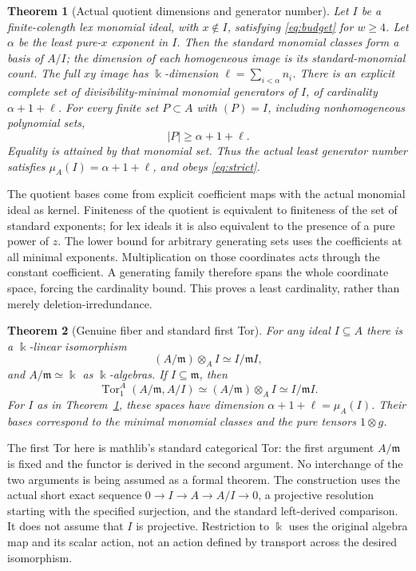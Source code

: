 \documentclass[11pt,a4paper]{article}
\newtheorem{theorem}{Theorem}[section]
\newcommand{\kk}{\Bbbk}
\begin{document}
\begin{theorem}[Actual quotient dimensions and generator number]\label{thm:actual}
Let $I$ be a finite-colength lex monomial ideal, with $x\notin I$, satisfying
\eqref{eq:budget} for $w\ge4$. Let $\alpha$ be the least pure-$x$ exponent in $I$.
Then the standard monomial classes form a basis of $A/I$; the dimension of each
homogeneous image is its standard-monomial count. The full $xy$ image has
$\kk$-dimension $\ell=\sum_{i<\alpha}n_i$.
There is an explicit complete set of divisibility-minimal monomial generators
of $I$, of cardinality $\alpha+1+\ell$. For every finite set $P\subset A$ with
$(P)=I$, including nonhomogeneous polynomial sets,
\[
 |P|\ge\alpha+1+\ell.
\]
Equality is attained by that monomial set. Thus the actual least generator
number satisfies $\mu_A(I)=\alpha+1+\ell$, and obeys \eqref{eq:strict}.
\end{theorem}

The quotient bases come from explicit coefficient maps with the actual
monomial ideal as kernel. Finiteness of the quotient is equivalent to finiteness
of the set of standard exponents; for lex ideals it is also equivalent to the
presence of a pure power of $z$. The lower bound for arbitrary generating sets
uses the coefficients at all minimal exponents. Multiplication on those
coordinates acts through the constant coefficient. A generating family
therefore spans the whole coordinate space, forcing the cardinality bound.
This proves a least cardinality, rather than merely deletion-irredundance.

\begin{theorem}[Genuine fiber and standard first Tor]\label{thm:tor}
For any ideal $I\subseteq A$ there is a $\kk$-linear isomorphism
\[
 (A/\mathfrak m)\otimes_A I\simeq I/\mathfrak mI,
\]
and $A/\mathfrak m\simeq\kk$ as $\kk$-algebras. If $I\subseteq\mathfrak m$, then
\[
 \operatorname{Tor}_1^A(A/\mathfrak m,A/I)
 \simeq (A/\mathfrak m)\otimes_A I\simeq I/\mathfrak mI.
\]
For $I$ as in Theorem~\ref{thm:actual}, these spaces have dimension
$\alpha+1+\ell=\mu_A(I)$. Their bases correspond to the minimal monomial
classes and the pure tensors $1\otimes g$.
\end{theorem}

The first Tor here is mathlib's standard categorical Tor: the first argument
$A/\mathfrak m$ is fixed and the functor is derived in the second argument.
No interchange of the two arguments is being assumed as a formal theorem.
The construction uses the actual short exact sequence
$0\to I\to A\to A/I\to0$, a projective resolution starting with the specified
surjection, and the standard left-derived comparison. It does not assume that
$I$ is projective. Restriction to $\kk$ uses the original algebra map and its
scalar action, not an action defined by transport across the desired isomorphism.
\end{document}
